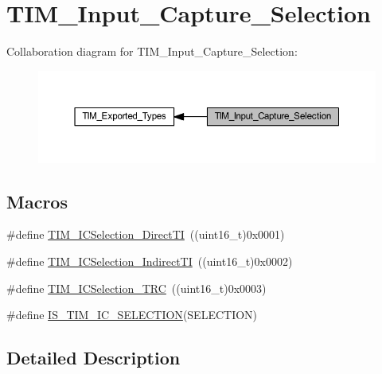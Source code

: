 \hypertarget{group___t_i_m___input___capture___selection}{}\section{T\+I\+M\+\_\+\+Input\+\_\+\+Capture\+\_\+\+Selection}
\label{group___t_i_m___input___capture___selection}
Collaboration diagram for T\+I\+M\+\_\+\+Input\+\_\+\+Capture\+\_\+\+Selection\+:
\nopagebreak
\begin{figure}[H]
\begin{center}
\leavevmode
\includegraphics[width=350pt]{group___t_i_m___input___capture___selection}
\end{center}
\end{figure}
\subsection*{Macros}
\begin{DoxyCompactItemize}
\item 
\#define \hyperlink{group___t_i_m___input___capture___selection_ga3d38876044457b7faefe951d367ac8c3}{T\+I\+M\+\_\+\+I\+C\+Selection\+\_\+\+Direct\+TI}~((uint16\+\_\+t)0x0001)
\item 
\#define \hyperlink{group___t_i_m___input___capture___selection_ga2289b684133ac0b81ddfcd860d01b144}{T\+I\+M\+\_\+\+I\+C\+Selection\+\_\+\+Indirect\+TI}~((uint16\+\_\+t)0x0002)
\item 
\#define \hyperlink{group___t_i_m___input___capture___selection_ga2cd464e97ffd6ea3208ec65672f9a373}{T\+I\+M\+\_\+\+I\+C\+Selection\+\_\+\+T\+RC}~((uint16\+\_\+t)0x0003)
\item 
\#define \hyperlink{group___t_i_m___input___capture___selection_ga623d8592109f4702829ae7fc3806bcb8}{I\+S\+\_\+\+T\+I\+M\+\_\+\+I\+C\+\_\+\+S\+E\+L\+E\+C\+T\+I\+ON}(S\+E\+L\+E\+C\+T\+I\+ON)
\end{DoxyCompactItemize}


\subsection{Detailed Description}


